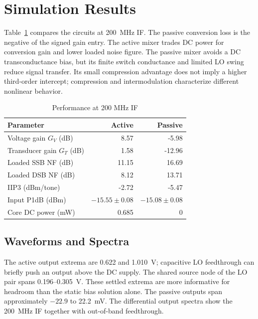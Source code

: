 \section{Simulation Results}
Table~\ref{tab:performance} compares the circuits at 200~MHz IF. The passive
conversion loss is the negative of the signed gain entry. The active mixer
trades DC power for conversion gain and lower loaded noise figure. The
passive mixer avoids a DC transconductance bias, but its finite switch
conductance and limited LO swing reduce signal transfer. Its small
compression advantage does not imply a higher third-order intercept;
compression and intermodulation characterize different nonlinear behavior.

\begin{table}[!t]
\caption{Performance at 200 MHz IF}
\label{tab:performance}
\centering\footnotesize
\setlength{\tabcolsep}{4pt}
\begin{tabularx}{\columnwidth}{@{}Xrr@{}}
\toprule
Parameter & Active & Passive \\
\midrule
Voltage gain $G_V$ (dB) & 8.57 & -5.98 \\
Transducer gain $G_T$ (dB) & 1.58 & -12.96 \\
Loaded SSB NF (dB) & 11.15 & 16.69 \\
Loaded DSB NF (dB) & 8.12 & 13.71 \\
IIP3 (dBm/tone) & -2.72 & -5.47 \\
Input P1dB (dBm) & $-15.55\pm0.08$ & $-15.08\pm0.08$ \\
Core DC power (mW) & 0.685 & 0 \\
\bottomrule
\end{tabularx}
\end{table}

\subsection{Waveforms and Spectra}
The active output extrema are 0.622 and 1.010~V; capacitive LO feedthrough
can briefly push an output above the DC supply. The shared source node of
the LO pair spans 0.196--0.305~V. These settled extrema are more informative
for headroom than the static bias solution alone. The passive outputs span
approximately $-22.9$ to 22.2~mV. The differential output spectra show the
200~MHz IF together with out-of-band feedthrough.



